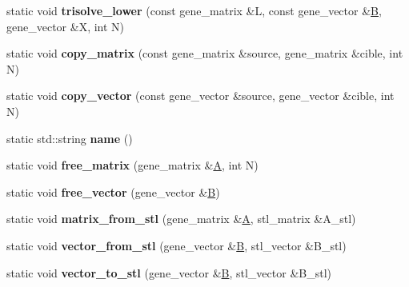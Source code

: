 \begin{DoxyCompactItemize}
static void {\bfseries trisolve\+\_\+lower} (const gene\+\_\+matrix \&L, const gene\+\_\+vector \&\hyperlink{group___core___module_class_eigen_1_1_matrix}{B}, gene\+\_\+vector \&X, int N)
\item 
\mbox{\label{classmtl4__interface_a18f1be3a3856f6832bab6c574bee15a5}} 
static void {\bfseries copy\+\_\+matrix} (const gene\+\_\+matrix \&source, gene\+\_\+matrix \&cible, int N)
\item 
\mbox{\label{classmtl4__interface_a085ae5e0c9dab9baa3294f37afb6cd04}} 
static void {\bfseries copy\+\_\+vector} (const gene\+\_\+vector \&source, gene\+\_\+vector \&cible, int N)
\item 
\mbox{\label{classmtl4__interface_a435f1ee0a4c76a995a19b722efd69931}} 
static std\+::string {\bfseries name} ()
\item 
\mbox{\label{classmtl4__interface_abbd7d5eec097afa14a93af3c7ce1969c}} 
static void {\bfseries free\+\_\+matrix} (gene\+\_\+matrix \&\hyperlink{group___core___module_class_eigen_1_1_matrix}{A}, int N)
\item 
\mbox{\label{classmtl4__interface_a37c7f6cf2afa4fc2a7120817c366310d}} 
static void {\bfseries free\+\_\+vector} (gene\+\_\+vector \&\hyperlink{group___core___module_class_eigen_1_1_matrix}{B})
\item 
\mbox{\label{classmtl4__interface_a0cc7f8989c6aaeb5b141e0455182064f}} 
static void {\bfseries matrix\+\_\+from\+\_\+stl} (gene\+\_\+matrix \&\hyperlink{group___core___module_class_eigen_1_1_matrix}{A}, stl\+\_\+matrix \&A\+\_\+stl)
\item 
\mbox{\label{classmtl4__interface_a6dfe3c64075969fe118bc5ae4367fffd}} 
static void {\bfseries vector\+\_\+from\+\_\+stl} (gene\+\_\+vector \&\hyperlink{group___core___module_class_eigen_1_1_matrix}{B}, stl\+\_\+vector \&B\+\_\+stl)
\item 
\mbox{\label{classmtl4__interface_a6ed87ddf048aad7a37aeddc68e034353}} 
static void {\bfseries vector\+\_\+to\+\_\+stl} (gene\+\_\+vector \&\hyperlink{group___core___module_class_eigen_1_1_matrix}{B}, stl\+\_\+vector \&B\+\_\+stl)

\end{DoxyCompactItemize}
